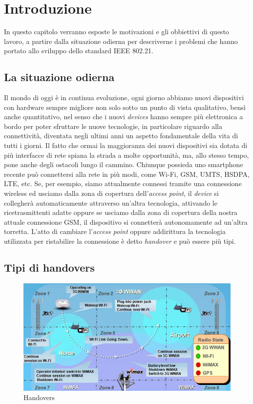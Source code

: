 \chapter{Introduzione}

In questo capitolo verranno esposte le motivazioni e gli obbiettivi di questo lavoro, a partire dalla situazione odierna per descriverne i problemi che hanno portato allo sviluppo dello standard IEEE 802.21.


\section{La situazione odierna}
Il mondo di oggi è in continua evoluzione, ogni giorno abbiamo nuovi dispositivi con hardware sempre migliore non solo sotto un punto di vista qualitativo, bensì anche quantitativo, nel senso che i nuovi {\em devices} hanno sempre più elettronica a bordo per poter sfruttare le nuove tecnologie, in particolare riguardo alla connettività, diventata negli ultimi anni un aspetto fondamentale della vita di tutti i giorni. Il fatto che ormai la maggioranza dei nuovi dispositivi sia dotata di più interfacce di rete spiana la strada a molte opportunità, ma, allo stesso tempo, pone anche degli ostacoli lungo il cammino.
Chiunque possieda uno smartphone recente può connettersi alla rete in più modi, come Wi-Fi, GSM, UMTS, HSDPA, LTE, etc. Se, per esempio, siamo attualmente connessi tramite una connessione wireless ed usciamo dalla zona di copertura dell'{\em access point}, il {\em device} si collegherà automaticamente attraverso un'altra tecnologia, attivando le ricetrasmittenti adatte oppure se usciamo dalla zona di copertura della nostra attuale connessione GSM, il dispositivo si connetterà autonomamente ad un'altra torretta. L'atto di cambiare l'{\em access point} oppure addirittura la tecnologia utilizzata per ristabilire la connessione è detto {\em handover} e può essere più tipi.

\section{Tipi di handovers}

\begin{figure}[h!]
\centering
\includegraphics[scale=0.5]{handovers.jpg}
\caption{Handovers}
\end{figure}

